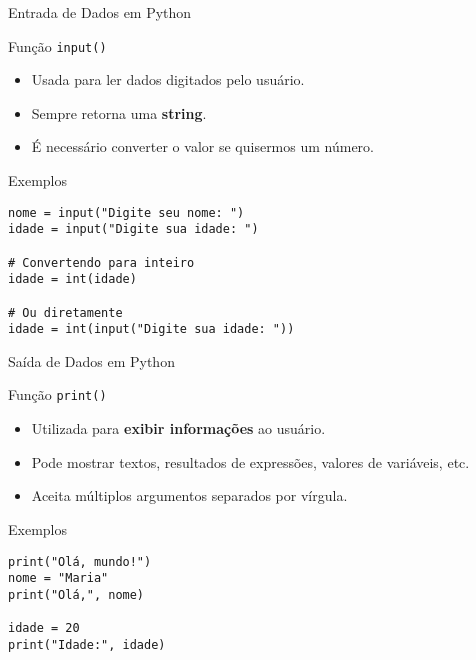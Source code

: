 \begin{frame}[fragile]{Entrada de Dados em Python}

    \begin{block}{Função \texttt{input()}}
        \begin{itemize}
            \item Usada para ler dados digitados pelo usuário.
            \item Sempre retorna uma \textbf{string}.
            \item É necessário converter o valor se quisermos um número.
        \end{itemize}
    \end{block}

    \vspace{1em}

    \begin{block}{Exemplos}
        \begin{verbatim}
nome = input("Digite seu nome: ")
idade = input("Digite sua idade: ")

# Convertendo para inteiro
idade = int(idade)

# Ou diretamente
idade = int(input("Digite sua idade: "))
\end{verbatim}
    \end{block}

\end{frame}


\begin{frame}[fragile]{Saída de Dados em Python}

    \begin{block}{Função \texttt{print()}}
        \begin{itemize}
            \item Utilizada para \textbf{exibir informações} ao usuário.
            \item Pode mostrar textos, resultados de expressões, valores de variáveis, etc.
            \item Aceita múltiplos argumentos separados por vírgula.
        \end{itemize}
    \end{block}

    \vspace{1em}

    \begin{block}{Exemplos}
        \begin{verbatim}
print("Olá, mundo!")
nome = "Maria"
print("Olá,", nome)

idade = 20
print("Idade:", idade)
\end{verbatim}
    \end{block}

\end{frame}
